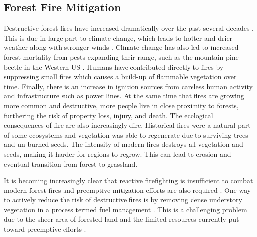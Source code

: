 \subsection{Forest Fire Mitigation} 
\label{background:forest_fire_mitigation}
Destructive forest fires have increased dramatically over the past several decades \cite{spreading_like_wildfire, ayanz2021, nfn2022}. This is due in large part to climate change, which leads to hotter and drier weather along with stronger winds \cite{spreading_like_wildfire}. Climate change has also led to increased forest mortality from pests expanding their range, such as the mountain pine beetle in the Western US \cite{Jenkins2014AndFuels}. Humans have  contributed directly to fires by suppressing small fires which causes a build-up of flammable vegetation over time. Finally, there is an increase in ignition sources from careless human activity and infrastructure such as power lines. At the same time that fires are growing more common and destructive, more people live in close proximity to forests, furthering the risk of property loss, injury, and death. The ecological consequences of fire are also increasingly dire. Historical fires were a natural part of some ecosystems and vegetation was able to regenerate due to surviving trees and un-burned seeds. The intensity of modern fires destroys all vegetation and seeds, making it harder for regions to regrow. This can lead to erosion and eventual transition from forest to grassland.

It is becoming increasingly clear that reactive firefighting is insufficient to combat modern forest fires and preemptive mitigation efforts are also required \cite{spreading_like_wildfire}. One way to actively reduce the risk of destructive fires is by removing dense understory vegetation in a process termed fuel management \cite{Fire2021FuelsManagement, WildlandFireResiliencyProgram20214Plan, Agriculture2019HazardousComplex}. This is a challenging problem due to the sheer area of forested land and the limited resources currently put toward preemptive efforts \cite{spreading_like_wildfire}.


